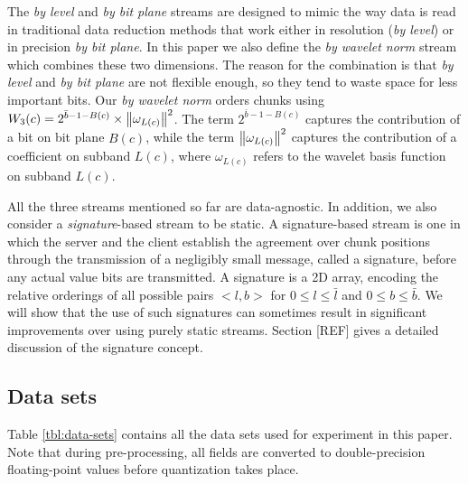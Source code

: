 The \emph{by level} and \emph{by bit plane} streams are designed to mimic the way data is read in
traditional data reduction methods that work either in resolution (\emph{by level}) or in precision
\emph{by bit plane}. In this paper we also define the \emph{by wavelet norm} stream which combines
these two dimensions. The reason for the combination is that \emph{by level} and \emph{by bit plane}
are not flexible enough, so they tend to waste space for less important bits. Our \emph{by wavelet
norm} orders chunks using $W_3(c)=2^{\bar{b}-1-B(c)}\times \left\lVert\omega_{L(c)}\right\rVert^2$. The term
$2^{\bar{b}-1-B(c)}$ captures the contribution of a bit on bit plane $B(c)$, while the term
$\left\lVert\omega_{L(c)}\right\rVert^2$ captures the contribution of a coefficient on subband $L(c)$, where
$\omega_{L(c)}$ refers to the wavelet basis function on subband $L(c)$.

All the three streams mentioned so far are data-agnostic. In addition, we also consider a
\emph{signature}-based stream to be static. A signature-based stream is one in which the server and
the client establish the agreement over chunk positions through the transmission of a negligibly
small message, called a signature, before any actual value bits are transmitted. A signature is a 2D
array, encoding the relative orderings of all possible pairs $<l,b>$ for $0\leq l \leq \bar{l}$ and
$0\leq b \leq \bar{b}$. We will show that the use of such signatures can sometimes result in
significant improvements over using purely static streams. Section [REF] gives a detailed discussion
of the signature concept.

\subsection{Data sets}
\label{sec:data-sets}

Table \ref{tbl:data-sets} contains all the data sets used for experiment in this paper. Note that
during pre-processing, all fields are converted to double-precision floating-point values before
quantization takes place.

